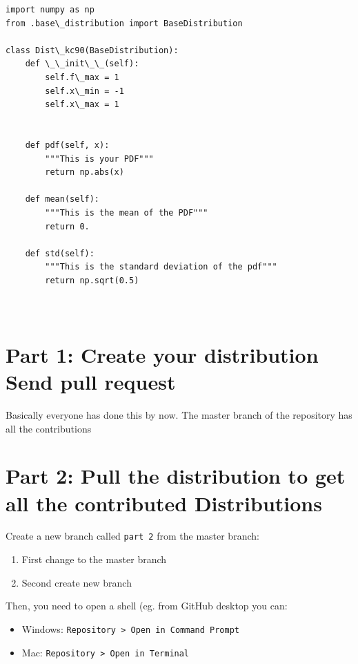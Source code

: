 \documentclass[11pt]{article}
\providecommand{\tightlist}{%
      \setlength{\itemsep}{0pt}\setlength{\parskip}{0pt}}
\begin{document}
    \begin{Verbatim}[commandchars=\\\{\}]
import numpy as np
from .base\_distribution import BaseDistribution

class Dist\_kc90(BaseDistribution):
	def \_\_init\_\_(self):
		self.f\_max = 1
		self.x\_min = -1
		self.x\_max = 1


	def pdf(self, x):
		"""This is your PDF"""
		return np.abs(x)

	def mean(self):
		"""This is the mean of the PDF"""
		return 0.

	def std(self):
		"""This is the standard deviation of the pdf"""
		return np.sqrt(0.5)



    \end{Verbatim}

    \section{Part 1: Create your distribution Send pull
request}\label{part-1-create-your-distribution-send-pull-request}

Basically everyone has done this by now. The master branch of the
repository has all the contributions

\section{Part 2: Pull the distribution to get all the contributed
Distributions}\label{part-2-pull-the-distribution-to-get-all-the-contributed-distributions}

Create a new branch called \texttt{part\ 2} from the master branch:

\begin{enumerate}
\def\labelenumi{\arabic{enumi}.}
\tightlist
\item
  First change to the master branch
\item
  Second create new branch
\end{enumerate}

Then, you need to open a shell (eg. from GitHub desktop you can:

\begin{itemize}
\tightlist
\item
  Windows:
  \texttt{Repository\ \textgreater{}\ Open\ in\ Command\ Prompt}
\item
  Mac: \texttt{Repository\ \textgreater{}\ Open\ in\ Terminal}
\end{itemize}
\end{document}
